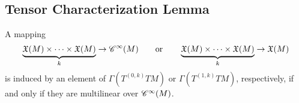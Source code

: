 \begin{appendix}
\section{Tensor Characterization Lemma}

\begin{theorem}
A mapping
\begin{equation*}
\underbrace{\mathfrak{X}(M) \times \dots \times \mathfrak{X}(M)}_{k} \to \mathscr{C}^\infty(M) \qquad \text{or} \qquad \underbrace{\mathfrak{X}(M) \times \dots \times \mathfrak{X}(M)}_{k} \to \mathfrak{X}(M)
\end{equation*}
\noindent is induced by an element of $\Gamma(T^{(0,k)}TM)$ or $\Gamma(T^{(1,k)}TM)$, respectively, if and only if they are multilinear over $\mathscr{C}^\infty(M)$.
\end{theorem}


\end{appendix}
